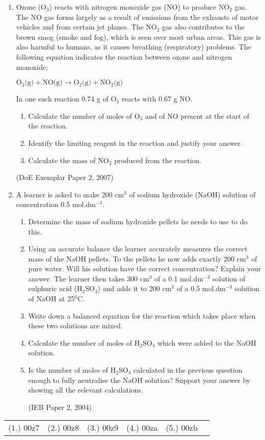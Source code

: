\begin{eocexercises}{}
\begin{enumerate}
\item{Ozone (O$_{3}$) reacts with nitrogen monoxide gas (NO) to produce NO$_{2}$ gas. The NO gas forms largely as a result of emissions from the exhausts of motor vehicles and from certain jet planes. The NO$_{2}$ gas also contributes to the brown smog (smoke and fog), which is seen over most urban areas. This gas is also harmful to humans, as it causes breathing (respiratory) problems. The following equation indicates the reaction between ozone and nitrogen monoxide:
\begin{center}
$\text{O}_{3}\text{(g)} + \text{NO(g)} \rightarrow \text{O}_{2}\text{(g)} + \text{NO}_{2}\text{(g)}$
\end{center}
In one such reaction 0.74 g of O$_{3}$ reacts with 0.67 g NO.
\begin{enumerate}
\item{Calculate the number of moles of O$_{3}$ and of NO present at the start of the reaction.}
\item{Identify the limiting reagent in the reaction and justify your answer.}
\item{Calculate the mass of NO$_{2}$ produced from the reaction.}
\end{enumerate}
(DoE Exemplar Paper 2, 2007)}
\item{A learner is asked to make 200 cm$^{3}$ of sodium hydroxide (NaOH) solution of concentration 0.5 mol.dm$^{-3}$.
\begin{enumerate}
\item{Determine the mass of sodium hydroxide pellets he needs to use to do this.}
\item{Using an accurate balance the learner accurately measures the correct mass of the NaOH pellets. To the pellets he now adds exactly 200 cm$^{3}$ of pure water. Will his solution have the correct concentration? Explain your answer.
\newline
The learner then takes 300 cm$^{3}$ of a 0.1 mol.dm$^{-3}$ solution of sulphuric acid (H$_{2}$SO$_{4}$) and adds it to 200 cm$^{3}$ of a 0.5 mol.dm$^{-3}$ solution of NaOH at 25$^{0}$C.}
\item{Write down a balanced equation for the reaction which takes place when these two solutions are mixed.}
\item{Calculate the number of moles of H$_{2}$SO$_{4}$ which were added to the NaOH solution.}
\item{Is the number of moles of H$_{2}$SO$_{4}$ calculated in the previous question enough to fully neutralise the NaOH solution? Support your answer by showing all the relevant calculations.}

(IEB Paper 2, 2004)
\end{enumerate}
}
\end{enumerate}

\practiceinfo

\begin{tabular}[h]{cccccc}
(1.) 00z7 & (2.) 00z8 & (3.) 00z9 & (4.) 00za & (5.) 00zb & 
 \end{tabular}
\end{eocexercises}








